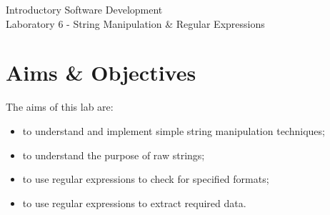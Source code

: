 \documentclass[12pt,oneside]{cttutorial}
\begin{document}
\tutorialextra{}


 

\newcommand{\xkcd}[2]{
	\begin{center}
	\texttt{[image: ../../Figures/png/\#1]}
	\newline
	\url{http://xkcd.com/#2}
	\end{center}
	\bigskip
}

\newcommand{\alert}[1]
{\marginpar
  {\makebox[0 pt][l]
    {\texttt{[image: ../../Figures/png/warning.png]}
  }
  \parbox{2 cm}{{\sffamily \bfseries \tiny #1}}}}


\renewcommand{\baselinestretch}{1.5}
\textwidth=15cm

\newcommand{\I}{j}

\begin{center}
\begin{bfseries}
Introductory Software Development\\Laboratory 6 - String Manipulation \& Regular Expressions
\end{bfseries}
\end{center}

\section{Aims \& Objectives}

The aims of this lab are:

\begin{itemize}
\item to understand and implement simple string manipulation techniques;
\item to understand the purpose of raw strings;
\item to use regular expressions to check for specified formats;
\item to use regular expressions to extract required data.
\end{itemize}
\end{document}
